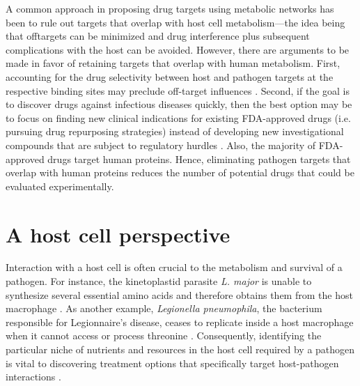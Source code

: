 

A common approach in proposing drug targets using metabolic 
networks has been to rule out targets that overlap with host 
cell metabolism---the idea being that offtargets can be minimized 
and drug interference plus subsequent complications with the host 
can be avoided. However, there are arguments to be made in favor 
of retaining targets that overlap with human metabolism. First, 
accounting for the drug selectivity between host and pathogen 
targets at the respective binding sites may preclude off-target 
influences \cite{Hopkins:2008bb}. Second, if the goal is to discover drugs against 
infectious diseases quickly, then the best option may be to 
focus on finding new clinical indications for existing FDA-approved 
drugs (i.e. pursuing drug repurposing strategies) instead of 
developing new investigational compounds that are subject to 
regulatory hurdles \cite{Chong:2007dl}. Also, the majority of FDA-approved 
drugs target human proteins. Hence, eliminating pathogen 
targets that overlap with human proteins reduces the number 
of potential drugs that could be evaluated experimentally.

\section{A host cell perspective}
Interaction with a host cell is often crucial to the metabolism 
and survival of a pathogen. For instance, the kinetoplastid 
parasite \textit{L. major} is unable to synthesize several essential 
amino acids and therefore obtains them from the host macrophage \cite{McConville:2007df}. 
As another example, \textit{Legionella pneumophila}, the bacterium 
responsible for Legionnaire's disease, ceases to replicate 
inside a host macrophage when it cannot access or process 
threonine \cite{Sauer:2005kf}. Consequently, identifying the particular 
niche of nutrients and resources in the host cell required 
by a pathogen is vital to discovering treatment options 
that specifically target host-pathogen interactions \cite{Brown:2008gm}.


